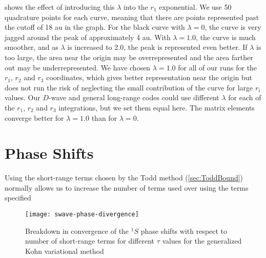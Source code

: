 \documentclass[Dissertation.tex]{subfiles}
\begin{document}
 shows the effect of introducing this $\lambda$ into the $r_1$
exponential. We use 50 quadrature points for each curve, meaning that there 
are points represented past the cutoff of 18 au in the graph. For the black 
curve with $\lambda = 0$, the curve is very jagged around the peak of 
approximately 4 au. With $\lambda = 1.0$, the curve is much smoother, and as
$\lambda$ is increased to 2.0, the peak is represented even better. If $\lambda$
is too large, the area near the origin may be overrepresented and the area 
farther out may be underrepresented. We have chosen $\lambda = 1.0$ for all 
of our runs for the $r_1$, $r_2$ and $r_3$ coordinates, which gives better
representation near the origin but does not  run the risk of neglecting the
small contribution of the curve for large $r_i$ values. Our $D$-wave and
general long-range codes could use different $\lambda$ for each of the
$r_1$, $r_2$ and $r_3$ integrations, but we set them equal here. The matrix
elements converge better for $\lambda = 1.0$ than for $\lambda = 0$.


\section{Phase Shifts}
\label{sec:CompPhase}

Using the short-range terms chosen by the Todd method (\cref{sec:ToddBound})
normally allows us to increase the number of terms used over using the terms
specified 


\begin{figure}[H]
	\centering
	\texttt{[image: swave-phase-divergence]}
	\caption{Breakdown in convergence of the $^1S$ phase
shifts with respect to number of short-range terms for different $\tau$
values for the generalized Kohn variational method}
	\label{fig:swave-phase-divergence}
\end{figure}
\end{document}

